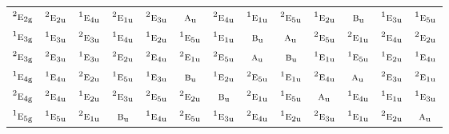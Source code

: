 \documentclass[10pt,a4paper]{article}
\numberwithin{equation}{section}
\newcommand{\irr}[1]{\text{\normalfont\scshape #1}}
\newcommand{\conjpair}[1]{{}^{#1}}
\newcommand{\ptag}[1]{\mathrm{#1}}
\begin{document}
{\begin{longtable}{@{}lcccccccccccc@{}}
$\conjpair{2}\irr{e}_{2\ptag{g}}$ & $\conjpair{2}\irr{e}_{2\ptag{u}}$ & $\conjpair{1}\irr{e}_{4\ptag{u}}$ & $\conjpair{2}\irr{e}_{1\ptag{u}}$ & $\conjpair{2}\irr{e}_{3\ptag{u}}$ & $\irr{a}_{\ptag{u}}$ & $\conjpair{2}\irr{e}_{4\ptag{u}}$ & $\conjpair{1}\irr{e}_{1\ptag{u}}$ & $\conjpair{2}\irr{e}_{5\ptag{u}}$ & $\conjpair{1}\irr{e}_{2\ptag{u}}$ & $\irr{b}_{\ptag{u}}$ & $\conjpair{1}\irr{e}_{3\ptag{u}}$ & $\conjpair{1}\irr{e}_{5\ptag{u}}$\\
$\conjpair{1}\irr{e}_{3\ptag{g}}$ & $\conjpair{1}\irr{e}_{3\ptag{u}}$ & $\conjpair{2}\irr{e}_{3\ptag{u}}$ & $\conjpair{1}\irr{e}_{4\ptag{u}}$ & $\conjpair{1}\irr{e}_{2\ptag{u}}$ & $\conjpair{1}\irr{e}_{5\ptag{u}}$ & $\conjpair{1}\irr{e}_{1\ptag{u}}$ & $\irr{b}_{\ptag{u}}$ & $\irr{a}_{\ptag{u}}$ & $\conjpair{2}\irr{e}_{5\ptag{u}}$ & $\conjpair{2}\irr{e}_{1\ptag{u}}$ & $\conjpair{2}\irr{e}_{4\ptag{u}}$ & $\conjpair{2}\irr{e}_{2\ptag{u}}$\\
$\conjpair{2}\irr{e}_{3\ptag{g}}$ & $\conjpair{2}\irr{e}_{3\ptag{u}}$ & $\conjpair{1}\irr{e}_{3\ptag{u}}$ & $\conjpair{2}\irr{e}_{2\ptag{u}}$ & $\conjpair{2}\irr{e}_{4\ptag{u}}$ & $\conjpair{2}\irr{e}_{1\ptag{u}}$ & $\conjpair{2}\irr{e}_{5\ptag{u}}$ & $\irr{a}_{\ptag{u}}$ & $\irr{b}_{\ptag{u}}$ & $\conjpair{1}\irr{e}_{1\ptag{u}}$ & $\conjpair{1}\irr{e}_{5\ptag{u}}$ & $\conjpair{1}\irr{e}_{2\ptag{u}}$ & $\conjpair{1}\irr{e}_{4\ptag{u}}$\\
$\conjpair{1}\irr{e}_{4\ptag{g}}$ & $\conjpair{1}\irr{e}_{4\ptag{u}}$ & $\conjpair{2}\irr{e}_{2\ptag{u}}$ & $\conjpair{1}\irr{e}_{5\ptag{u}}$ & $\conjpair{1}\irr{e}_{3\ptag{u}}$ & $\irr{b}_{\ptag{u}}$ & $\conjpair{1}\irr{e}_{2\ptag{u}}$ & $\conjpair{2}\irr{e}_{5\ptag{u}}$ & $\conjpair{1}\irr{e}_{1\ptag{u}}$ & $\conjpair{2}\irr{e}_{4\ptag{u}}$ & $\irr{a}_{\ptag{u}}$ & $\conjpair{2}\irr{e}_{3\ptag{u}}$ & $\conjpair{2}\irr{e}_{1\ptag{u}}$\\
$\conjpair{2}\irr{e}_{4\ptag{g}}$ & $\conjpair{2}\irr{e}_{4\ptag{u}}$ & $\conjpair{1}\irr{e}_{2\ptag{u}}$ & $\conjpair{2}\irr{e}_{3\ptag{u}}$ & $\conjpair{2}\irr{e}_{5\ptag{u}}$ & $\conjpair{2}\irr{e}_{2\ptag{u}}$ & $\irr{b}_{\ptag{u}}$ & $\conjpair{2}\irr{e}_{1\ptag{u}}$ & $\conjpair{1}\irr{e}_{5\ptag{u}}$ & $\irr{a}_{\ptag{u}}$ & $\conjpair{1}\irr{e}_{4\ptag{u}}$ & $\conjpair{1}\irr{e}_{1\ptag{u}}$ & $\conjpair{1}\irr{e}_{3\ptag{u}}$\\
$\conjpair{1}\irr{e}_{5\ptag{g}}$ & $\conjpair{1}\irr{e}_{5\ptag{u}}$ & $\conjpair{2}\irr{e}_{1\ptag{u}}$ & $\irr{b}_{\ptag{u}}$ & $\conjpair{1}\irr{e}_{4\ptag{u}}$ & $\conjpair{2}\irr{e}_{5\ptag{u}}$ & $\conjpair{1}\irr{e}_{3\ptag{u}}$ & $\conjpair{2}\irr{e}_{4\ptag{u}}$ & $\conjpair{1}\irr{e}_{2\ptag{u}}$ & $\conjpair{2}\irr{e}_{3\ptag{u}}$ & $\conjpair{1}\irr{e}_{1\ptag{u}}$ & $\conjpair{2}\irr{e}_{2\ptag{u}}$ & $\irr{a}_{\ptag{u}}$\\

\end{longtable}}
\end{document}
